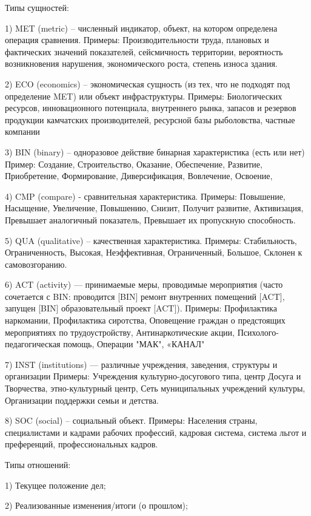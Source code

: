 \documentclass{article}
\begin{document}
Типы сущностей: 

1) MET (metric) – численный индикатор, объект, на котором определена операция сравнения. 
Примеры: Производительности труда, плановых и фактических значений показателей, сейсмичность территории, вероятность возникновения нарушения, экономического роста, степень износа здания.

2) ECO (economics) – экономическая сущность (из тех, что не подходят под определение MET) или объект инфраструктуры. 
Примеры: Биологических ресурсов, инновационного потенциала, внутреннего рынка, запасов и резервов продукции камчатских производителей, ресурсной базы рыболовства, частные компании
 
3) BIN (binary) – одноразовое действие бинарная характеристика (есть или нет) 
Пример: Создание, Строительство, Оказание, Обеспечение, Развитие, Приобретение, Формирование, Диверсификация, Вовлечение, Освоение, 

4) CMP (compare) - сравнительная характеристика. 
Примеры: Повышение, Насыщение, Увеличение, Повышению, Снизит, Получит развитие, Активизация, Превышает аналогичный показатель, Превышает их пропускную способность. 

5) QUA (qualitative) – качественная характеристика. 
Примеры: Стабильность, Ограниченность, Высокая, Неэффективная, Ограниченный, Большое, Склонен к самовозгоранию. 

6) ACT (activity) — принимаемые меры, проводимые мероприятия (часто сочетается с BIN: проводится [BIN] ремонт внутренних помещений [ACT], запущен [BIN] образовательный проект [ACT]). 
Примеры: Профилактика наркомании, Профилактика сиротства, Оповещение граждан о предстоящих мероприятиях по трудоустройству, Антинаркотические акции, Психолого-педагогическая помощь, Операции "МАК", «КАНАЛ" 

7) INST (institutions) — различные учреждения, заведения, структуры и организации 
Примеры: Учреждения культурно-досугового типа, центр Досуга и Творчества, этно-культурный центр, Сеть муниципальных учреждений культуры, Организации поддержки семьи и детства. 

8) SOC (social) – социальный объект. 
Примеры: Населения страны, специалистами и кадрами рабочих профессий, кадровая система, система льгот и преференций, профессиональных кадров.

Типы отношений: 

1) Текущее положение дел;

2) Реализованные изменения/итоги (о прошлом);
\end{document}
